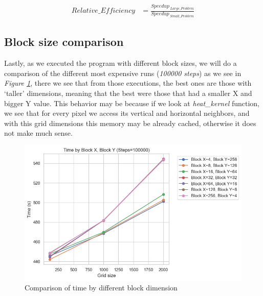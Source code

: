\documentclass[../main.tex]{subfiles}
\begin{document}
\begin{equation}
    \begin{split}
        Relative\_Efficiency&=\frac{Speedup_{\ Large\_Problem}}{Speedup_{\ Small\_Problem}}
    \end{split}
    \label{eq:relative-efficiency}
\end{equation}


\subsection{Block size comparison}

Lastly, as we executed the program with different block sizes, we will do a comparison of the different most expensive runs (\textit{100000 steps}) as we see in \textit{Figure \ref{fig:block-size}}, there we see that from those executions, the best ones are those with `taller' dimensions, meaning that the best were those that had a smaller X and bigger Y value. This behavior may be because if we look at \textit{heat\_kernel} function, we see that for every pixel we access its vertical and horizontal neighbors, and with this grid dimensions this memory may be already cached, otherwise it does not make much sense.

\begin{figure}[!ht]
    \centering
    \includegraphics[width=0.9\linewidth]{media/images/time-by-block-dimensions.png}
    \caption{Comparison of time by different block dimension}
    \label{fig:block-size}
\end{figure}
\end{document}
